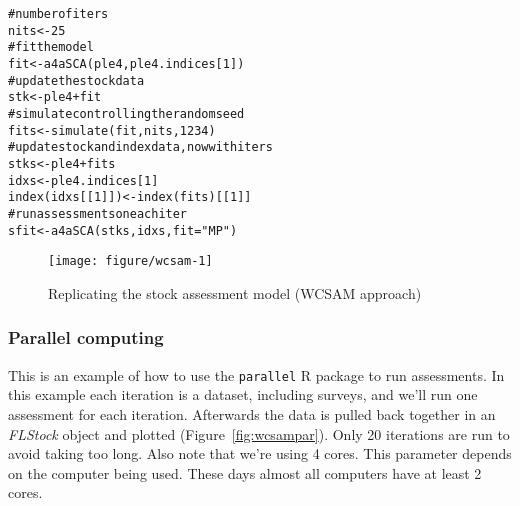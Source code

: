 \documentclass[a4paper,english,10pt]{article}\usepackage[]{graphicx}\usepackage[]{color}
\makeatletter
\def\maxwidth{ %
  \ifdim\Gin@nat@width>\linewidth
    \linewidth
  \else
    \Gin@nat@width
  \fi
}
\newcommand{\hlnum}[1]{\textcolor[rgb]{0.2,0.2,0.2}{#1}}%
\newcommand{\hlstr}[1]{\textcolor[rgb]{0.2,0.2,0.2}{#1}}%
\newcommand{\hlcom}[1]{\textcolor[rgb]{0.2,0.267,0.4}{#1}}%
\newcommand{\hlopt}[1]{\textcolor[rgb]{0.2,0.2,0.2}{#1}}%
\newcommand{\hlstd}[1]{\textcolor[rgb]{0,0,0}{#1}}%
\newcommand{\hlkwb}[1]{\textcolor[rgb]{0.361,0.506,0.596}{#1}}%
\newcommand{\hlkwc}[1]{\textcolor[rgb]{0.361,0.506,0.596}{#1}}%
\newcommand{\hlkwd}[1]{\textcolor[rgb]{0.361,0.506,0.596}{#1}}%
\newenvironment{kframe}{%
 \def\at@end@of@kframe{}%
 \ifinner\ifhmode%
  \def\at@end@of@kframe{\end{minipage}}%
  \begin{minipage}{\columnwidth}%
 \fi\fi%
 \def\FrameCommand##1{\hskip\@totalleftmargin \hskip-\fboxsep
 \colorbox{shadecolor}{##1}\hskip-\fboxsep
     \hskip-\linewidth \hskip-\@totalleftmargin \hskip\columnwidth}%
 \MakeFramed {\advance\hsize-\width
   \@totalleftmargin\z@ \linewidth\hsize
   \@setminipage}}%
 {\par\unskip\endMakeFramed%
 \at@end@of@kframe}
\newenvironment{knitrout}{}{} %
\newcommand{\pkg}[1]{{\texttt{#1}}}
\newcommand{\class}[1]{{\textit{#1}}}
\makeatother
\begin{document}
\begin{knitrout}
\color{fgcolor}\begin{kframe}
\begin{alltt}
\hlcom{# number of iters}
\hlstd{nits} \hlkwb{<-} \hlnum{25}
\hlcom{# fit the model}
\hlstd{fit} \hlkwb{<-} \hlkwd{a4aSCA}\hlstd{(ple4, ple4.indices[}\hlnum{1}\hlstd{])}
\hlcom{# update the stock data}
\hlstd{stk} \hlkwb{<-} \hlstd{ple4} \hlopt{+} \hlstd{fit}
\hlcom{# simulate controlling the random seed}
\hlstd{fits} \hlkwb{<-} \hlkwd{simulate}\hlstd{(fit, nits,} \hlnum{1234}\hlstd{)}
\hlcom{# update stock and index data, now with iters}
\hlstd{stks} \hlkwb{<-} \hlstd{ple4} \hlopt{+} \hlstd{fits}
\hlstd{idxs} \hlkwb{<-} \hlstd{ple4.indices[}\hlnum{1}\hlstd{]}
\hlkwd{index}\hlstd{(idxs[[}\hlnum{1}\hlstd{]])} \hlkwb{<-} \hlkwd{index}\hlstd{(fits)[[}\hlnum{1}\hlstd{]]}
\hlcom{# run assessments on each iter}
\hlstd{sfit} \hlkwb{<-} \hlkwd{a4aSCA}\hlstd{(stks, idxs,} \hlkwc{fit}\hlstd{=}\hlstr{"MP"}\hlstd{)}
\end{alltt}
\end{kframe}
\end{knitrout}

\begin{knitrout}
\color{fgcolor}\begin{figure}[H]

{\centering \texttt{[image: figure/wcsam-1]} 

}

\caption[Replicating the stock assessment model (WCSAM approach)]{Replicating the stock assessment model (WCSAM approach)\label{fig:wcsam}}
\end{figure}


\end{knitrout}

\subsubsection{Parallel computing}

This is an example of how to use the \pkg{parallel} R package to run assessments. In this example each iteration is a dataset, including surveys, and we'll run one assessment for each iteration. Afterwards the data is pulled back together in an \class{FLStock} object and plotted (Figure~\ref{fig:wcsampar}). Only 20 iterations are run to avoid taking too long. Also note that we're using 4 cores. This parameter depends on the computer being used. These days almost all computers have at least 2 cores.
\end{document}
